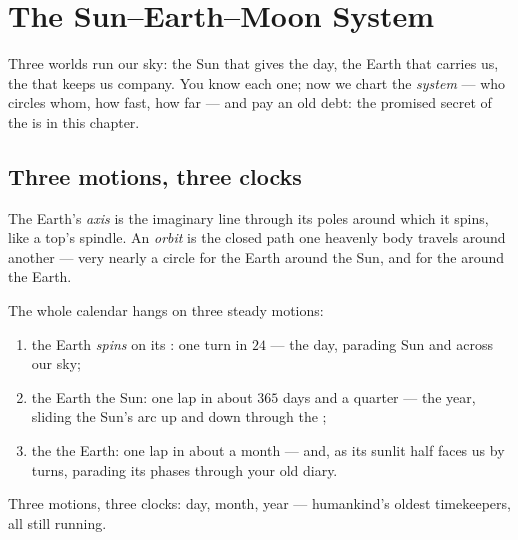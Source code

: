 \chapter{The Sun--Earth--Moon System}\label{ch:g6:sun-earth-moon}

Three worlds run our sky: the Sun that gives the day, the Earth
that carries us, the  that keeps us company. You know each
one; now we chart the \emph{system} --- who circles whom, how
fast, how far --- and pay an old debt: the promised secret of the
 is in this chapter.

\section{Three motions, three clocks}

\begin{definition}\label{def:g6:sun-earth-moon:axisorbit}
The Earth's \emph{axis} is the imaginary line through
its poles around which it spins, like a top's spindle. An
\emph{orbit} is the closed path one heavenly body
travels around another --- very nearly a circle for the Earth
around the Sun, and for the  around the Earth.
\end{definition}

\begin{proposition}\label{prop:g6:sun-earth-moon:motions}
The whole calendar hangs on three steady motions:
\begin{enumerate}
  \item the Earth \emph{spins} on its : one turn in $24$
         --- the day, parading Sun and  across our sky;
  \item the Earth \emph{} the Sun: one lap in about $365$
        days and a quarter --- the year, sliding the Sun's arc up
        and down through the ;
  \item the  \emph{} the Earth: one lap in about a
        month --- and, as its sunlit half faces us by turns,
        parading its phases through your old  diary.
\end{enumerate}
Three motions, three clocks: day, month, year --- humankind's
oldest timekeepers, all still running.
\end{proposition}

